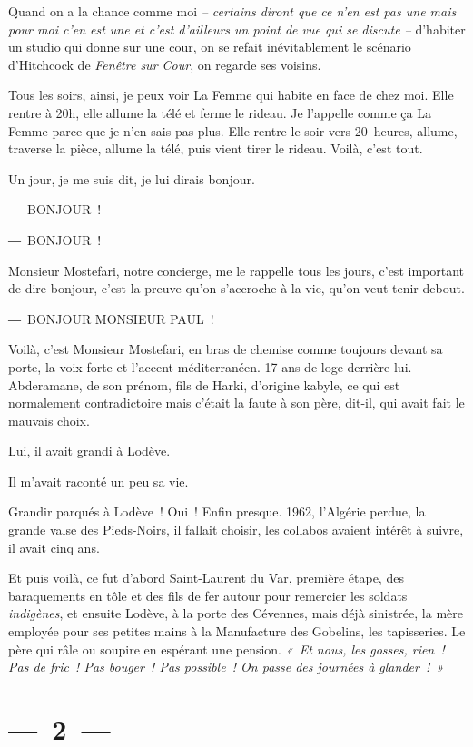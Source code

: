 \documentclass[french,twoside]{book} %
\begin{document}
\noindent Quand on a la chance comme moi \emph{– certains diront que ce n’en est pas une mais pour moi c’en est une et c’est d’ailleurs un point de vue qui se discute –} d’habiter un studio qui donne sur une cour, on se refait inévitablement le scénario d’Hitchcock de \emph{Fenêtre sur Cour}, on regarde ses voisins.\par
Tous les soirs, ainsi, je peux voir La Femme qui habite en face de chez moi. Elle rentre à 20h, elle allume la télé et ferme le rideau. Je l’appelle comme ça La Femme parce que je n’en sais pas plus. Elle rentre le soir vers 20 heures, allume, traverse la pièce, allume la télé, puis vient tirer le rideau. Voilà, c’est tout.\par
Un jour, je me suis dit, je lui dirais bonjour.\par
― BONJOUR !\par
― BONJOUR !\par
Monsieur Mostefari, notre concierge, me le rappelle tous les jours, c’est important de dire bonjour, c’est la preuve qu’on s’accroche à la vie, qu’on veut tenir debout.\par
― BONJOUR MONSIEUR PAUL !\par
\bigbreak
\noindent Voilà, c’est Monsieur Mostefari, en bras de chemise comme toujours devant sa porte, la voix forte et l’accent méditerranéen. 17 ans de loge derrière lui. Abderamane, de son prénom, fils de Harki, d’origine kabyle, ce qui est normalement contradictoire mais c’était la faute à son père, dit-il, qui avait fait le mauvais choix.\par
Lui, il avait grandi à Lodève.\par
Il m’avait raconté un peu sa vie.\par
Grandir parqués à Lodève ! Oui ! Enfin presque. 1962, l’Algérie perdue, la grande valse des Pieds-Noirs, il fallait choisir, les collabos avaient intérêt à suivre, il avait cinq ans.\par
Et puis voilà, ce fut d’abord Saint-Laurent du Var, première étape, des baraquements en tôle et des fils de fer autour pour remercier les soldats \emph{indigènes}, et ensuite Lodève, à la porte des Cévennes, mais déjà sinistrée, la mère employée pour ses petites mains à la Manufacture des Gobelins, les tapisseries. Le père qui râle ou soupire en espérant une pension. \emph{« Et nous, les gosses, rien ! Pas de fric ! Pas bouger ! Pas possible ! On passe des journées à glander ! »}

\section[{— 2 —}]{— 2 —}
\renewcommand{\leftmark}{— 2 —}
\end{document}
